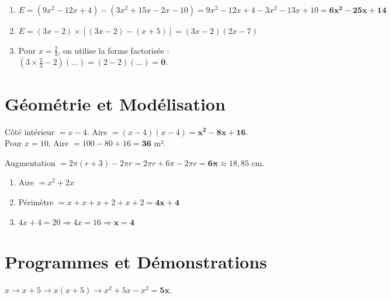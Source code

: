 \documentclass[a4paper]{book}
\begin{document}
    \begin{exercice}
        \begin{enumerate}
            \item $E = (9x^2 - 12x + 4) - (3x^2 + 15x - 2x - 10) = 9x^2 - 12x + 4 - 3x^2 - 13x + 10 = \mathbf{6x^2 - 25x + 14}$
            \item $E = (3x-2) \times [(3x-2) - (x+5)] = (3x-2)(2x-7)$
            \item Pour $x = \frac{2}{3}$, on utilise la forme factorisée : $(3 \times \frac{2}{3} - 2)(\dots) = (2-2)(\dots) = \mathbf{0}$.
        \end{enumerate}
    \end{exercice}
    
\section{Géométrie et Modélisation}
    
    \begin{exercice}
        Côté intérieur $= x - 4$. Aire $= (x-4)(x-4) = \mathbf{x^2 - 8x + 16}$. \\
        Pour $x=10$, Aire $= 100 - 80 + 16 = \mathbf{36}$ m².
    \end{exercice}
    
    \begin{exercice}
        Augmentation $= 2\pi(r+3) - 2\pi r = 2\pi r + 6\pi - 2\pi r = \mathbf{6\pi} \approx 18,85$ cm.
    \end{exercice}
    
    \begin{exercice}
        \begin{enumerate}
            \item Aire $= x^2 + 2x$
            \item Périmètre $= x + x + x + 2 + x + 2 = \mathbf{4x + 4}$
            \item $4x + 4 = 20 \Longrightarrow 4x = 16 \Longrightarrow \mathbf{x = 4}$
        \end{enumerate}
    \end{exercice}
    
\section{Programmes et Démonstrations}
    
    \begin{exercice}
        $x \longrightarrow x+5 \longrightarrow x(x+5) \longrightarrow x^2+5x - x^2 = \mathbf{5x}$.
    \end{exercice}
    
\end{document}
